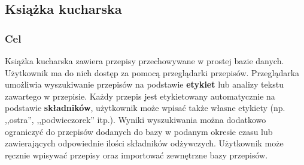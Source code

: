 \documentclass[a4paper,11pt,titlepage,twoside]{mwart}
\begin{document}
\subsection{Książka kucharska}
\subsubsection{Cel}
Książka kucharska zawiera przepisy przechowywane w prostej bazie danych. Użytkownik ma do nich dostęp za pomocą przeglądarki przepisów. Przeglądarka umożliwia wyszukiwanie przepisów na podstawie \textbf{etykiet} lub analizy tekstu zawartego w przepisie. Każdy przepis jest etykietowany automatycznie na podstawie \textbf{składników}, użytkownik może wpisać także własne etykiety (np. ,,ostra'', ,,podwieczorek'' itp.). Wyniki wyszukiwania można dodatkowo ograniczyć do przepisów dodanych do bazy w podanym okresie czasu lub zawierających odpowiednie ilości składników odżywczych. Użytkownik może ręcznie wpisywać przepisy oraz importować zewnętrzne bazy przepisów.
\end{document}
